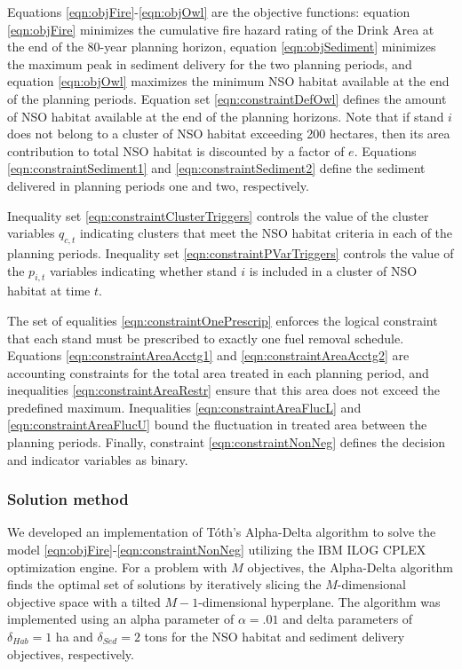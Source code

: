 Equations \eqref{eqn:objFire}-\eqref{eqn:objOwl} are the objective functions: equation \eqref{eqn:objFire} minimizes the cumulative fire hazard rating of the Drink Area at the end of the 80-year planning horizon, equation \eqref{eqn:objSediment} minimizes the maximum peak in sediment delivery for the two planning periods, and equation \eqref{eqn:objOwl} maximizes the minimum NSO habitat available at the end of the planning periods. Equation set \eqref{eqn:constraintDefOwl} defines the amount of NSO habitat available at the end of the planning horizons. Note that if stand $i$ does not belong to a cluster of NSO habitat exceeding 200 hectares, then its area contribution to total NSO habitat is discounted by a factor of $e$. Equations \eqref{eqn:constraintSediment1} and \eqref{eqn:constraintSediment2} define the sediment delivered in planning periods one and two, respectively.

Inequality set \eqref{eqn:constraintClusterTriggers} controls the value of the cluster variables $q_{c,t}$ indicating clusters that meet the NSO habitat criteria in each of the planning periods. Inequality set \eqref{eqn:constraintPVarTriggers} controls the value of the $p_{i,t}$ variables indicating whether stand $i$ is included in a cluster of NSO habitat at time $t$.

The set of equalities \eqref{eqn:constraintOnePrescrip} enforces the logical constraint that each stand must be prescribed to exactly one fuel removal schedule. Equations \eqref{eqn:constraintAreaAcctg1} and \eqref{eqn:constraintAreaAcctg2} are accounting constraints for the total area treated in each planning period, and inequalities \eqref{eqn:constraintAreaRestr} ensure that this area does not exceed the predefined maximum. Inequalities \eqref{eqn:constraintAreaFlucL} and \eqref{eqn:constraintAreaFlucU} bound the fluctuation in treated area between the planning periods. Finally, constraint \eqref{eqn:constraintNonNeg} defines the decision and indicator variables as binary.

\subsubsection{Solution method}
We developed an implementation of T\'{o}th's Alpha-Delta algorithm \cite{TothThesis} to solve the model \eqref{eqn:objFire}-\eqref{eqn:constraintNonNeg} utilizing the IBM ILOG CPLEX optimization engine. For a problem with $M$ objectives, the Alpha-Delta algorithm finds the optimal set of solutions by iteratively slicing the $M$-dimensional objective space with a tilted $M-1$-dimensional hyperplane. The algorithm was implemented using an alpha parameter of $\alpha = .01$ and delta parameters of $\delta_{Hab} = 1$ ha and $\delta_{Sed} = 2$ tons for the NSO habitat and sediment delivery objectives, respectively.

